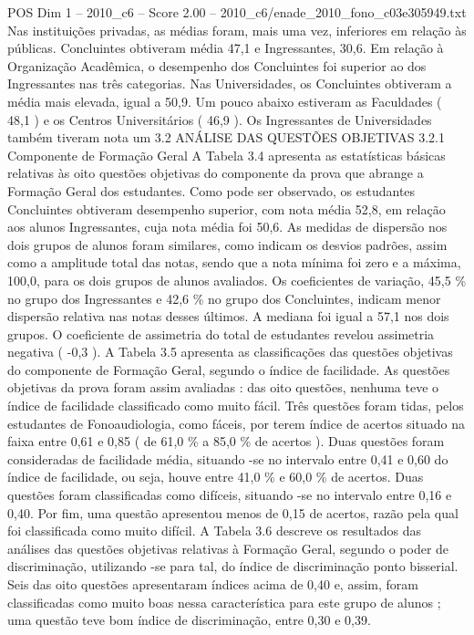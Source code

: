 \begin{textsample}{POS Dim 1 – 2010\_c6 – Score 2.00 – 2010\_c6/enade\_2010\_fono\_c03e305949.txt}
Nas instituições privadas, as médias foram, mais uma vez, inferiores em relação às públicas.
Concluintes obtiveram média 47,1 e Ingressantes, 30,6.
Em relação à Organização Acadêmica, o desempenho dos Concluintes foi superior ao dos Ingressantes nas três categorias.
Nas Universidades, os Concluintes obtiveram a média mais elevada, igual a 50,9.
Um pouco abaixo estiveram as Faculdades ( 48,1 ) e os Centros Universitários ( 46,9 ).
Os Ingressantes de Universidades também tiveram nota um 3.2 ANÁLISE DAS QUESTÕES OBJETIVAS 3.2.1 Componente de Formação Geral A Tabela 3.4 apresenta as estatísticas básicas relativas às oito questões objetivas do componente da prova que abrange a Formação Geral dos estudantes.
Como pode ser observado, os estudantes Concluintes obtiveram desempenho superior, com nota média 52,8, em relação aos alunos Ingressantes, cuja nota média foi 50,6.
As medidas de dispersão nos dois grupos de alunos foram similares, como indicam os desvios padrões, assim como a amplitude total das notas, sendo que a nota mínima foi zero e a máxima, 100,0, para os dois grupos de alunos avaliados.
Os coeficientes de variação, 45,5 \% no grupo dos Ingressantes e 42,6 \% no grupo dos Concluintes, indicam menor dispersão relativa nas notas desses últimos.
A mediana foi igual a 57,1 nos dois grupos.
O coeficiente de assimetria do total de estudantes revelou assimetria negativa ( -0,3 ).
A Tabela 3.5 apresenta as classificações das questões objetivas do componente de Formação Geral, segundo o índice de facilidade.
As questões objetivas da prova foram assim avaliadas : das oito questões, nenhuma teve o índice de facilidade classificado como muito fácil.
Três questões foram tidas, pelos estudantes de Fonoaudiologia, como fáceis, por terem índice de acertos situado na faixa entre 0,61 e 0,85 ( de 61,0 \% a 85,0 \% de acertos ).
Duas questões foram consideradas de facilidade média, situando -se no intervalo entre 0,41 e 0,60 do índice de facilidade, ou seja, houve entre 41,0 \% e 60,0 \% de acertos.
Duas questões foram classificadas como difíceis, situando -se no intervalo entre 0,16 e 0,40.
Por fim, uma questão apresentou menos de 0,15 de acertos, razão pela qual foi classificada como muito difícil.
A Tabela 3.6 descreve os resultados das análises das questões objetivas relativas à Formação Geral, segundo o poder de discriminação, utilizando -se para tal, do índice de discriminação ponto bisserial.
Seis das oito questões apresentaram índices acima de 0,40 e, assim, foram classificadas como muito boas nessa característica para este grupo de alunos ; uma questão teve bom índice de discriminação, entre 0,30 e 0,39.

\end{textsample}
